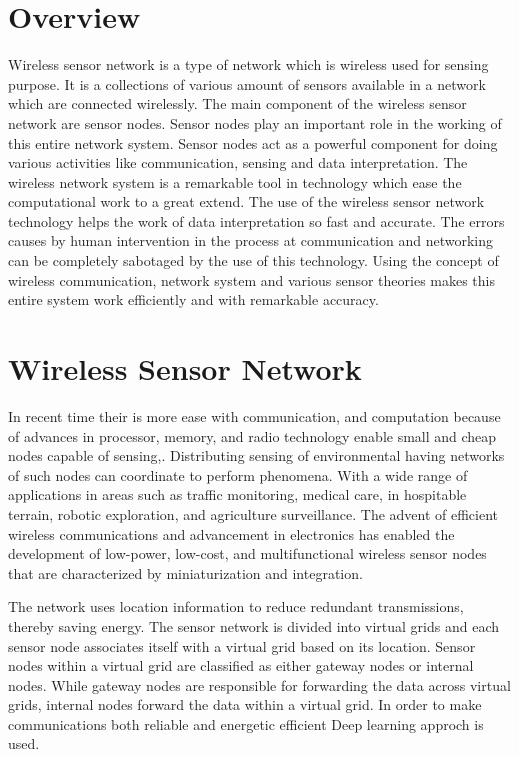\section{Overview}
Wireless sensor network is a type of network which is wireless used for sensing purpose. It is a collections of various amount of sensors available in a network which are connected wirelessly. The main component of the wireless sensor network are sensor nodes. Sensor nodes play an important role in the working of this entire network system. Sensor nodes act as a powerful component for doing various activities like communication, sensing and data interpretation. The wireless network system is a remarkable tool in technology which ease the computational work to a great extend. The use of the wireless sensor network technology helps the work of data interpretation so fast and accurate. The errors causes by human intervention in the process at communication and networking can be completely sabotaged by the use of this technology. Using the concept of wireless communication, network system and various sensor theories makes this entire system work efficiently and with remarkable accuracy.

\section{Wireless Sensor Network}

In recent time their is more ease with  communication, and computation because of advances in processor, memory, and radio technology enable small and cheap nodes capable of sensing,. Distributing sensing of environmental having networks of such nodes can coordinate to perform  phenomena. With a wide range of applications in areas such as traffic monitoring\cite{1}, medical care\cite{2}, in hospitable terrain, robotic exploration\cite{3}, and agriculture surveillance\cite{4}. The advent of efficient wireless communications and advancement in electronics has enabled the development of low-power, low-cost, and multifunctional wireless sensor nodes that are characterized by miniaturization and integration.

The network uses location information to reduce redundant transmissions, thereby saving energy. The sensor network is divided into virtual grids and each sensor node associates itself with a virtual grid based on its location. Sensor nodes within a virtual grid are classified as either gateway nodes or internal nodes. While gateway nodes are responsible for forwarding the data across virtual grids, internal nodes forward the data within a virtual grid. In order to make communications both reliable and energetic efficient Deep learning approch is used.

